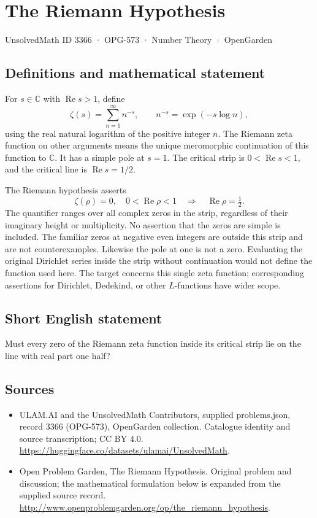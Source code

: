\documentclass[11pt,a4paper]{article}
\begin{document}
\section*{The Riemann Hypothesis}\label{3366}
{\small UnsolvedMath ID 3366 · OPG-573 · Number Theory · OpenGarden}
\subsection{Definitions and mathematical statement}
For $s\in\mathbb C$ with $\operatorname{Re}s>1$, define
\[
 \zeta(s)=\sum_{n=1}^{\infty}n^{-s},
 \qquad n^{-s}=\exp(-s\log n),
\]
using the real natural logarithm of the positive integer $n$. The
Riemann zeta function on other arguments means the unique meromorphic
continuation of this function to $\mathbb C$. It has a simple pole at
$s=1$. The critical strip is $0<\operatorname{Re}s<1$, and the critical
line is $\operatorname{Re}s=1/2$.

The Riemann hypothesis asserts
\[
 \zeta(\rho)=0,\quad 0<\operatorname{Re}\rho<1
       \quad\Longrightarrow\quad \operatorname{Re}\rho=\tfrac12.
\]
The quantifier ranges over all complex zeros in the strip, regardless
of their imaginary height or multiplicity. No assertion that the zeros
are simple is included. The familiar zeros at negative even integers
are outside this strip and are not counterexamples. Likewise the pole
at one is not a zero. Evaluating the original Dirichlet series inside
the strip without continuation would not define the function used here.
The target concerns this single zeta function; corresponding assertions
for Dirichlet, Dedekind, or other $L$-functions have wider scope.
\subsection{Short English statement}
Must every zero of the Riemann zeta function inside its critical strip lie on the line with real part one half?
\subsection{Sources}
\begin{itemize}
\item[S1] ULAM.AI and the UnsolvedMath Contributors, supplied problems.json, record 3366 (OPG-573), OpenGarden collection. Catalogue identity and source transcription; CC BY 4.0.
\url{https://huggingface.co/datasets/ulamai/UnsolvedMath}.
\item[S2] Open Problem Garden, The Riemann Hypothesis. Original problem and discussion; the mathematical formulation below is expanded from the supplied source record.
\url{http://www.openproblemgarden.org/op/the_riemann_hypothesis}.
\end{itemize}
\end{document}
